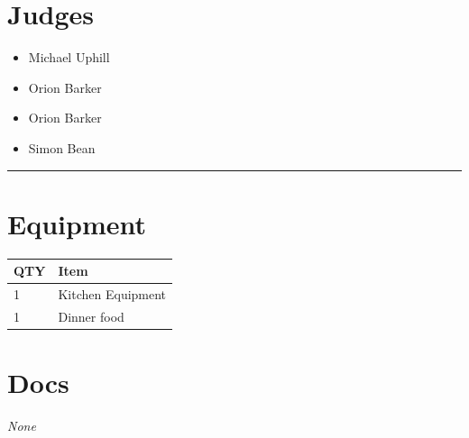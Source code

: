 \documentclass[10pt]{article}
\begin{document}
		\section*{\faUsers \: Judges}

		

	\begin{multicols}{2}

		\begin{itemize}
									\item Michael Uphill
									\item Orion Barker
						\end{itemize}

		\vfill\null
		\columnbreak

		\begin{itemize}
									\item Orion Barker
									\item Simon Bean
						\end{itemize}

		\vfill\null

		\end{multicols}



			\vspace{0.5cm}
	\hrule
	\vspace{0.5cm}

	\begin{multicols}{2}

		\section*{\faWrench \: Equipment}

		
	\begin{center}
			\begin{tabular}{p{2cm}p{4cm}}


				\textbf{QTY} & \textbf{Item} \\\toprule
												1&Kitchen Equipment\\\midrule
												1&Dinner food\\\midrule
								\end{tabular}

			\end{center}

		
		\vfill\null
		\columnbreak

			\section*{\faFile \: Docs}
		 	\textit{None}
	

		\vfill\null

		\end{multicols}
\end{document}
